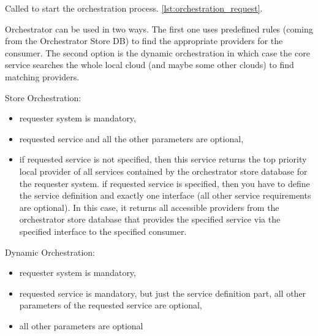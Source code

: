 \documentclass[a4paper]{arrowhead}
\begin{document}

Called to start the orchestration process. \ref{lst:orchestration_request}.

Orchestrator can be used in two ways. The first one uses predefined rules (coming from the Orchestrator Store DB) to find the appropriate providers for the consumer. The second option is the dynamic orchestration in which case the core service searches the whole local cloud (and maybe some other clouds) to find matching providers.

Store Orchestration:
\begin{itemize}
    \item requester system is mandatory,
    \item requested service and all the other parameters are optional,
    \item if requested service is not specified, then this service returns the top priority local provider of all services contained by the orchestrator store database for the requester system. if requested service is specified, then you have to define the service definition and exactly one interface (all other service requirements are optional). In this case, it returns all accessible providers from the orchestrator store database that provides the specified service via the specified interface to the specified consumer.
\end{itemize}

Dynamic Orchestration:
\begin{itemize}
    \item requester system is mandatory,
    \item requested service is mandatory, but just the service definition part, all other parameters of the requested service are optional,
    \item all other parameters are optional
\end{itemize}
\end{document}
